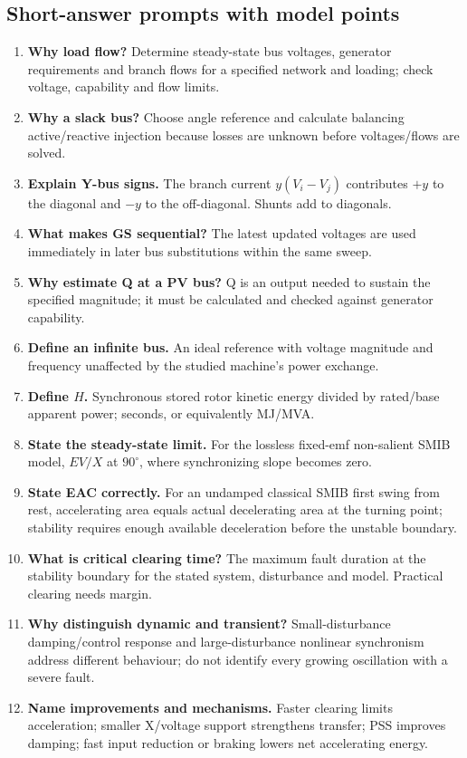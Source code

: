 \documentclass[11pt,a4paper]{article}
\begin{document}
\subsection{Short-answer prompts with model points}
\begin{enumerate}
\item \textbf{Why load flow?} Determine steady-state bus voltages, generator requirements and branch flows for a specified network and loading; check voltage, capability and flow limits.
\item \textbf{Why a slack bus?} Choose angle reference and calculate balancing active/reactive injection because losses are unknown before voltages/flows are solved.
\item \textbf{Explain Y-bus signs.} The branch current $y(V_i-V_j)$ contributes $+y$ to the diagonal and $-y$ to the off-diagonal. Shunts add to diagonals.
\item \textbf{What makes GS sequential?} The latest updated voltages are used immediately in later bus substitutions within the same sweep.
\item \textbf{Why estimate Q at a PV bus?} Q is an output needed to sustain the specified magnitude; it must be calculated and checked against generator capability.
\item \textbf{Define an infinite bus.} An ideal reference with voltage magnitude and frequency unaffected by the studied machine's power exchange.
\item \textbf{Define $H$.} Synchronous stored rotor kinetic energy divided by rated/base apparent power; seconds, or equivalently MJ/MVA.
\item \textbf{State the steady-state limit.} For the lossless fixed-emf non-salient SMIB model, $EV/X$ at $90^\circ$, where synchronizing slope becomes zero.
\item \textbf{State EAC correctly.} For an undamped classical SMIB first swing from rest, accelerating area equals actual decelerating area at the turning point; stability requires enough available deceleration before the unstable boundary.
\item \textbf{What is critical clearing time?} The maximum fault duration at the stability boundary for the stated system, disturbance and model. Practical clearing needs margin.
\item \textbf{Why distinguish dynamic and transient?} Small-disturbance damping/control response and large-disturbance nonlinear synchronism address different behaviour; do not identify every growing oscillation with a severe fault.
\item \textbf{Name improvements and mechanisms.} Faster clearing limits acceleration; smaller X/voltage support strengthens transfer; PSS improves damping; fast input reduction or braking lowers net accelerating energy.
\end{enumerate}
\end{document}

